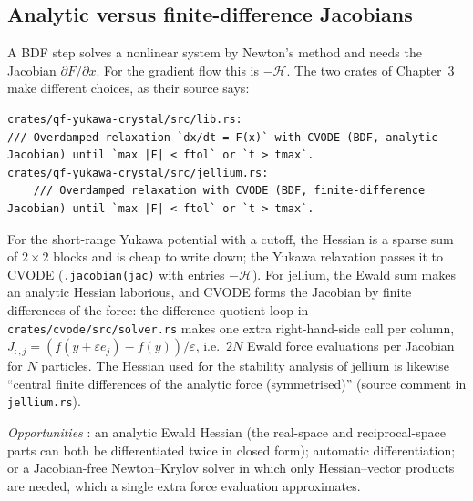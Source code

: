 \subsection{Analytic versus finite-difference Jacobians}
A BDF step solves a nonlinear system by Newton's method and needs the Jacobian $\partial F/\partial x$. For the
gradient flow this is $-\mathcal H$. The two crates of Chapter~3 make different choices, as their source says:
\begin{lstlisting}
crates/qf-yukawa-crystal/src/lib.rs:
/// Overdamped relaxation `dx/dt = F(x)` with CVODE (BDF, analytic Jacobian) until `max |F| < ftol` or `t > tmax`.
crates/qf-yukawa-crystal/src/jellium.rs:
    /// Overdamped relaxation with CVODE (BDF, finite-difference Jacobian) until `max |F| < ftol` or `t > tmax`.
\end{lstlisting}
For the short-range Yukawa potential with a cutoff, the Hessian is a sparse sum of $2\times2$ blocks and is cheap to
write down; the Yukawa relaxation passes it to CVODE (\texttt{.jacobian(jac)} with entries $-\mathcal H$). For
jellium, the Ewald sum makes an analytic Hessian laborious, and CVODE forms the Jacobian by finite differences of
the force: the difference-quotient loop in \texttt{crates/cvode/src/solver.rs} makes one extra right-hand-side
call per column, $J_{:,j}=(f(y+\varepsilon e_j)-f(y))/\varepsilon$, i.e.\ $2N$ Ewald force evaluations per
Jacobian for $N$ particles. The Hessian used for
the stability analysis of jellium is likewise ``central finite differences of the analytic force (symmetrised)''
(source comment in \texttt{jellium.rs}).

\emph{Opportunities} \tierC: an analytic Ewald Hessian (the real-space and reciprocal-space parts can both be
differentiated twice in closed form); automatic differentiation; or a Jacobian-free Newton--Krylov solver in which
only Hessian--vector products are needed, which a single extra force evaluation approximates.

